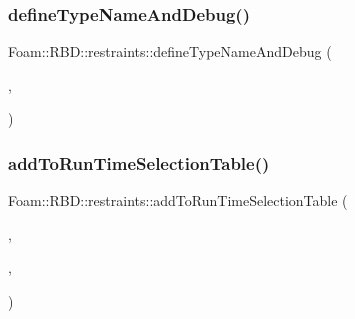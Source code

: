 \subsubsection{\texorpdfstring{define\+Type\+Name\+And\+Debug()}{defineTypeNameAndDebug()}}
{\footnotesize\ttfamily Foam\+::\+R\+B\+D\+::restraints\+::define\+Type\+Name\+And\+Debug (\begin{DoxyParamCaption}\item[{\hyperlink{classFoam_1_1RBD_1_1restraints_1_1externalCoupledForce}{external\+Coupled\+Force}}]{,  }\item[{0}]{ }\end{DoxyParamCaption})}

\mbox{\label{namespaceFoam_1_1RBD_1_1restraints_a8655ec7fb8c93a023f4b198eed0d3238}} 
\subsubsection{\texorpdfstring{add\+To\+Run\+Time\+Selection\+Table()}{addToRunTimeSelectionTable()}}
{\footnotesize\ttfamily Foam\+::\+R\+B\+D\+::restraints\+::add\+To\+Run\+Time\+Selection\+Table (\begin{DoxyParamCaption}\item[{restraint}]{,  }\item[{\hyperlink{classFoam_1_1RBD_1_1restraints_1_1externalCoupledForce}{external\+Coupled\+Force}}]{,  }\item[{dictionary}]{ }\end{DoxyParamCaption})}

